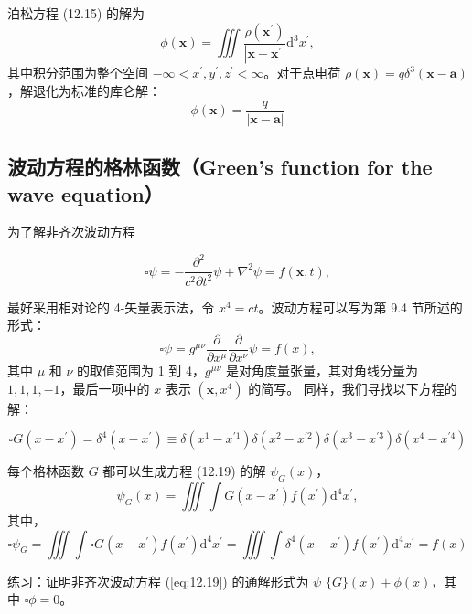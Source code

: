 泊松方程 (12.15) 的解为
 $$
\phi(\mathbf{x})=\iiint \frac{\rho\left(\mathbf{x}^{\prime}\right)}{\left|\mathbf{x}-\mathbf{x}^{\prime}\right|} \mathrm{d}^{3} x^{\prime},
$$
其中积分范围为整个空间
$-\infty<x^{\prime}, y^{\prime}, z^{\prime}<\infty$。对于点电荷
$\rho(\mathbf{x})=q \delta^{3}(\mathbf{x}-\mathbf{a})$，解退化为标准的库仑解：
 $$
\phi(\mathbf{x})=\frac{q}{|\mathbf{x}-\mathbf{a}|}
$$
\subsection{波动方程的格林函数（Green's function for the wave
equation）}

为了解非齐次波动方程

\begin{equation}\label{eq:12.19} 
 \square \psi=-\frac{\partial^{2}}{c^{2} \partial t^{2}} \psi+\nabla^{2} \psi=f(\mathbf{x}, t), 
 \end{equation}

最好采用相对论的 4-矢量表示法，令 $x^{4}=c t$。波动方程可以写为第 9.4
节所述的形式：
 $$
\square \psi=g^{\mu \nu} \frac{\partial}{\partial x^{\mu}} \frac{\partial}{\partial x^{\nu}} \psi=f(x),
$$
其中 $\mu$ 和 $\nu$ 的取值范围为 1 到 4，$g^{\mu \nu}$
是对角度量张量，其对角线分量为 $1,1,1,-1$，最后一项中的 $x$ 表示
$\left(\mathbf{x}, x^{4}\right)$ 的简写。 同样，我们寻找以下方程的解：

\begin{equation}\label{eq:12.20} 
 \square G\left(x-x^{\prime}\right)=\delta^{4}\left(x-x^{\prime}\right) \equiv \delta\left(x^{1}-x^{\prime 1}\right) \delta\left(x^{2}-x^{\prime 2}\right) \delta\left(x^{3}-x^{\prime 3}\right) \delta\left(x^{4}-x^{\prime 4}\right) 
 \end{equation}

每个格林函数 $G$ 都可以生成方程 (12.19) 的解 $\psi_{G}(x)$，
 $$
\psi_{G}(x)=\iiint \int G\left(x-x^{\prime}\right) f\left(x^{\prime}\right) \mathrm{d}^{4} x^{\prime},
$$
其中，
 $$
\square \psi_{G}=\iiint \int \square G\left(x-x^{\prime}\right) f\left(x^{\prime}\right) \mathrm{d}^{4} x^{\prime}=\iiint \int \delta^{4}\left(x-x^{\prime}\right) f\left(x^{\prime}\right) \mathrm{d}^{4} x^{\prime}=f(x)
$$
\begin{exercise}
  练习：证明非齐次波动方程 (\ref{eq:12.19}) 的通解形式为 $ \psi\_\{G\}(x)+\phi(x)$，其中 $\square \phi=0$。
\end{exercise}

